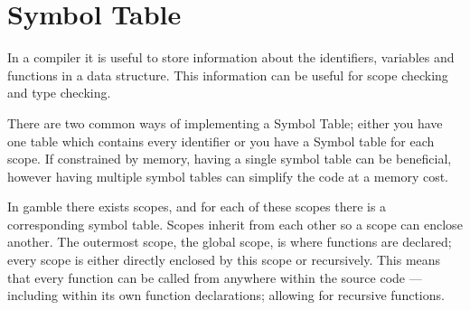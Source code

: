 \section{Symbol Table}
In a compiler it is useful to store information about the identifiers, variables and functions in a data structure. 
This information can be useful for scope checking and type checking.

There are two common ways of implementing a Symbol Table; either you have one table which contains every identifier or you have a Symbol table for each scope. 
If constrained by memory, having a single symbol table can be beneficial, however having multiple symbol tables can simplify the code at a memory cost. 

In \gls{gamble} there exists scopes, and for each of these scopes there is a corresponding symbol table. 
Scopes inherit from each other so a scope can enclose another. 
The outermost scope, the global scope, is where functions are declared; every scope is either directly enclosed by this scope or recursively.
This means that every function can be called from anywhere within the source code --- including within its own function declarations; allowing for recursive functions.

